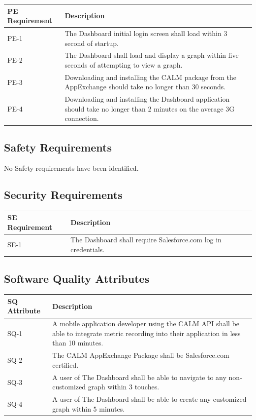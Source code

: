 \documentclass[12pt,oneside,letterpaper]{article}
\begin{document}
\begin{longtable}{|l|p{3.8in}|}
\hline
\textbf{PE Requirement}&\textbf{Description}\\
\hline
PE-1&The Dashboard initial login screen shall load within 3 second of startup.\\
\hline
PE-2&The Dashboard shall load and display a graph within five seconds of attempting to view a graph.\\
\hline
PE-3&Downloading and installing the CALM package from the AppExchange should take no longer than 30 seconds. \\
\hline
PE-4&Downloading and installing the Dashboard application should take no longer than 2 minutes on the average 3G connection.\\
\hline
\end{longtable}

\subsection{Safety Requirements}

No Safety requirements have been identified.

\subsection{Security Requirements}

\begin{longtable}{|l|p{3.8in}|}
\hline
\textbf{SE Requirement}&\textbf{Description}\\
\hline
SE-1&The Dashboard shall require Salesforce.com log in credentials.\\
\hline
\end{longtable}

\subsection{Software Quality Attributes}

\begin{longtable}{|l|p{3.8in}|}
\hline
\textbf{SQ Attribute}&\textbf{Description}\\
\hline
SQ-1&A mobile application developer using the CALM API shall be able to integrate metric recording into their application in less than 10 minutes.\\
\hline
SQ-2&The CALM AppExchange Package shall be Salesforce.com certified.\\
\hline
SQ-3&A user of The Dashboard shall be able to navigate to any non-customized graph within 3 touches. \\
\hline
SQ-4&A user of The Dashboard shall be able to create any customized graph within 5 minutes.\\
\hline
\end{longtable}
\end{document}

